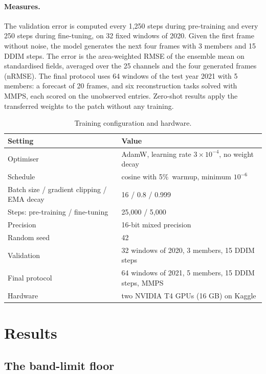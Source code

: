 \documentclass{article}
\newcommand{\pct}{\%\ }
\begin{document}
\paragraph{Measures.}
The validation error is computed every 1,250 steps during pre-training and every 250 steps during fine-tuning, on 32 fixed windows of 2020. Given the first frame without noise, the model generates the next four frames with 3 members and 15 DDIM steps. The error is the area-weighted RMSE of the ensemble mean on standardised fields, averaged over the 25 channels and the four generated frames (nRMSE). The final protocol uses 64 windows of the test year 2021 with 5 members: a forecast of 20 frames, and six reconstruction tasks solved with MMPS, each scored on the unobserved entries. Zero-shot results apply the transferred weights to the patch without any training.

\begin{table}[htbp]
\centering
\caption{Training configuration and hardware.}
\label{tab:config}
\footnotesize
\begin{tabular}{ll}
\toprule
Setting & Value \\
\midrule
Optimiser & AdamW, learning rate $3\times10^{-4}$, no weight decay \\
Schedule & cosine with 5\pct warmup, minimum $10^{-6}$ \\
Batch size / gradient clipping / EMA decay & 16 / 0.8 / 0.999 \\
Steps: pre-training / fine-tuning & 25,000 / 5,000 \\
Precision & 16-bit mixed precision \\
Random seed & 42 \\
Validation & 32 windows of 2020, 3 members, 15 DDIM steps \\
Final protocol & 64 windows of 2021, 5 members, 15 DDIM steps, MMPS \\
Hardware & two NVIDIA T4 GPUs (16 GB) on Kaggle \\
\bottomrule
\end{tabular}
\end{table}

\section{Results}
\label{sec:results}

\subsection{The band-limit floor}
\end{document}
